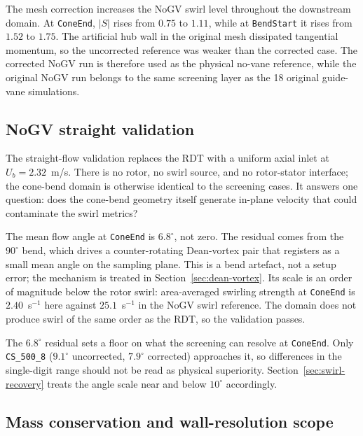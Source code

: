 The mesh correction increases the NoGV swirl level throughout the downstream domain. At \texttt{ConeEnd}, \( |S| \) rises from \(0.75\) to \(1.11\), while at \texttt{BendStart} it rises from \(1.52\) to \(1.75\). The artificial hub wall in the original mesh dissipated tangential momentum, so the uncorrected reference was weaker than the corrected case. The corrected NoGV run is therefore used as the physical no-vane reference, while the original NoGV run belongs to the same screening layer as the 18 original guide-vane simulations.

\subsection{NoGV straight validation}
\label{sec:nogv-straight-validation}

The straight-flow validation replaces the RDT with a uniform axial inlet at $U_b = 2.32$~m/s. There is no rotor, no swirl source, and no rotor-stator interface; the cone-bend domain is otherwise identical to the screening cases. It answers one question: does the cone-bend geometry itself generate in-plane velocity that could contaminate the swirl metrics?

The mean flow angle at \texttt{ConeEnd} is $6.8^\circ$, not zero. The residual comes from the $90^\circ$ bend, which drives a counter-rotating Dean-vortex pair that registers as a small mean angle on the sampling plane. This is a bend artefact, not a setup error; the mechanism is treated in Section~\ref{sec:dean-vortex}. Its scale is an order of magnitude below the rotor swirl: area-averaged swirling strength at \texttt{ConeEnd} is $2.40$~s$^{-1}$ here against $25.1$~s$^{-1}$ in the NoGV swirl reference. The domain does not produce swirl of the same order as the RDT, so the validation passes.

The $6.8^\circ$ residual sets a floor on what the screening can resolve at \texttt{ConeEnd}. Only \texttt{CS\_500\_8} ($9.1^\circ$ uncorrected, $7.9^\circ$ corrected) approaches it, so differences in the single-digit range should not be read as physical superiority. Section~\ref{sec:swirl-recovery} treats the angle scale near and below $10^\circ$ accordingly.

\subsection{Mass conservation and wall-resolution scope}
\label{sec:mass-and-yplus}
\label{sec:mass-and-mesh-scope}


